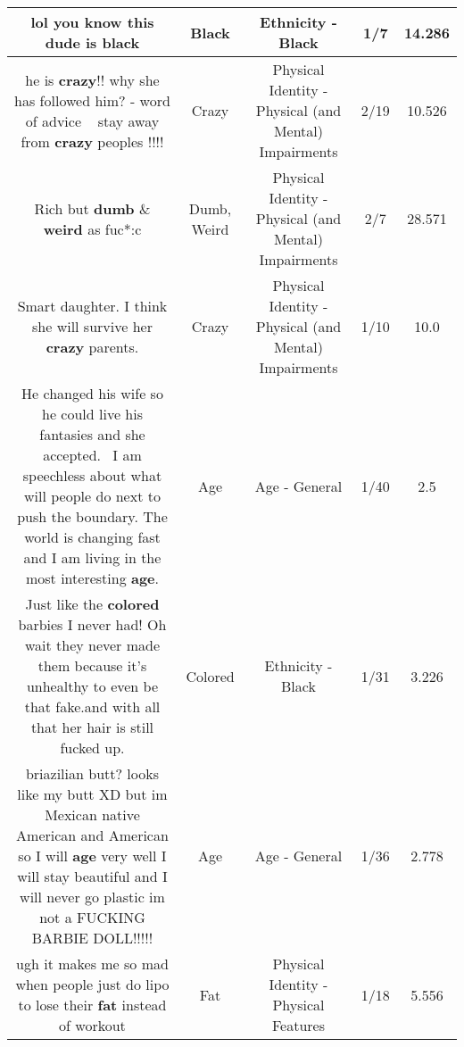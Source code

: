 \documentclass[11pt]{article}
\newlength\mylength
\begin{document}
\begin{center}
\begin{longtable}{|C{.65\mylength}|C{.30\mylength}|C{.12\mylength}|C{.12\mylength}|C{.12\mylength}|}
  \small lol you know this dude is black\normalsize   & Black & Ethnicity - Black & 1/7 & 14.286 \\  \hline
  \small he is \textbf{crazy}!! why she has followed him? - word of advice ~ stay away from \textbf{crazy} peoples !!!!\normalsize   & Crazy & Physical Identity - Physical (and Mental) Impairments & 2/19 & 10.526 \\  \hline
  \small Rich but \textbf{dumb} \& \textbf{weird} as fuc*:c\normalsize   & Dumb, Weird & Physical Identity - Physical (and Mental) Impairments & 2/7 & 28.571 \\  \hline
  \small Smart daughter.  I think she will survive her \textbf{crazy} parents.\normalsize   & Crazy & Physical Identity - Physical (and Mental) Impairments & 1/10 & 10.0 \\  \hline
  \small He changed his wife so he could live his fantasies and she accepted.  I am speechless about what will people do next to push the boundary. The world is changing fast and I am living in the most interesting \textbf{age}.\normalsize   & Age & Age - General & 1/40 & 2.5 \\  \hline
  \small Just like the \textbf{colored} barbies I never had! Oh wait they never made them because it's unhealthy to even be that fake.and with all that her hair is still fucked up.\normalsize   & Colored & Ethnicity - Black & 1/31 & 3.226 \\  \hline
  \small briazilian butt? looks like my butt XD but im Mexican native American and American so I will \textbf{age} very well I will stay beautiful and I will never go plastic im not a FUCKING BARBIE DOLL!!!!!\normalsize   & Age & Age - General & 1/36 & 2.778 \\  \hline
  \small ugh it makes me so mad when people just do lipo to lose their \textbf{fat} instead of workout\normalsize   & Fat & Physical Identity - Physical Features & 1/18 & 5.556 \\  \hline

\end{longtable}
\end{center}
\end{document}
